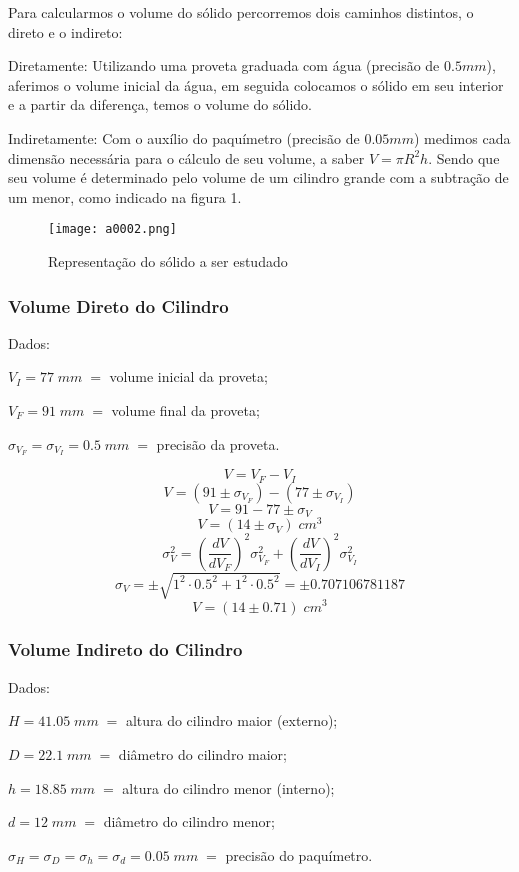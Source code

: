 \documentclass{article}
\begin{document}
Para calcularmos o volume do sólido percorremos dois caminhos distintos, o direto e o indireto:

Diretamente: Utilizando uma proveta graduada com água (precisão de $0.5mm$), aferimos o volume inicial da água, em seguida colocamos o sólido em seu interior e a partir da diferença, temos o volume do sólido.

Indiretamente: Com o auxílio do paquímetro (precisão de $0.05mm$) medimos cada dimensão necessária para o cálculo de seu volume, a saber $V = \pi R^2 h$. Sendo que seu volume é determinado pelo volume de um cilindro grande com a subtração de um menor, como indicado na figura 1.

\begin{figure}[h]
	\centering
	\texttt{[image: a0002.png]}
	\caption{Representação do sólido a ser estudado}
	\label{fig:solido}
\end{figure}


\subsubsection{Volume Direto do Cilindro}
Dados:

$V_I = 77\;mm\; =$ volume inicial da proveta;

$V_F = 91\;mm\; =$ volume final da proveta;

$\sigma_{V_F} = \sigma_{V_I} = 0.5\;mm\;=$ precisão da proveta.

\[V = V_F - V_I\]
\[V = (91 \pm \sigma_{V_F})-(77 \pm \sigma_{V_I})\]
\[V = 91-77\pm\sigma_{V}\]
\[V= (14 \pm\sigma_{V})\; cm^3\]
\[\sigma_{V}^2 = \left(\frac{dV}{dV_F}\right)^2\sigma_{V_F}^2+\left(\frac{dV}{dV_I}\right)^2\sigma_{V_I}^2\]
\[\sigma_{V} = \pm\sqrt{1^2\cdot0.5^2+1^2\cdot0.5^2}=\pm0.707106781187\]
\[V= (14 \pm0.71)\; cm^3\]


\subsubsection{Volume Indireto do Cilindro}
Dados:

$H = 41.05\;mm\;=$ altura do cilindro maior (externo);

$D = 22.1\;mm\;=$ diâmetro do cilindro maior;

$h = 18.85\;mm\;=$ altura do cilindro menor (interno);

$d = 12\;mm\;=$ diâmetro do cilindro menor;

$\sigma_H = \sigma_D = \sigma_h = \sigma_d = 0.05\;mm\;=$ precisão do paquímetro.
\end{document}
